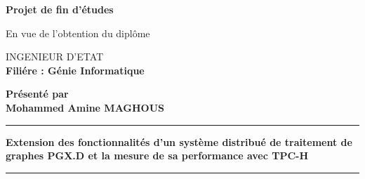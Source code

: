 \begin{center}



 \textbf{Projet de fin d'études} 


En vue de l'obtention du diplôme 

{\Huge \textsc{INGENIEUR D'ETAT}}\\
\textbf{Filiére : Génie Informatique }

\textbf{Présenté par}\\
\textbf{Mohammed Amine MAGHOUS }


\hrule {} {\LARGE \textbf{ Extension des fonctionnalités d'un système distribué de traitement de graphes PGX.D et la mesure de sa performance avec TPC-H }}  \hrule
{}





\end{center}

\cleardoublepage %
